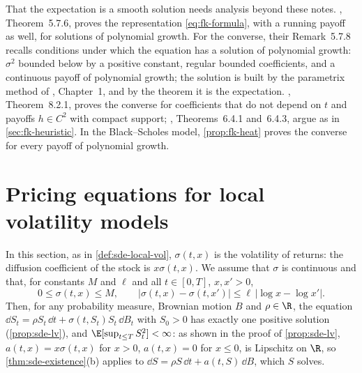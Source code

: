 \begin{remark}\label{rem:fk-converse}
That the expectation is a smooth solution needs analysis beyond these notes.
\textcite{karatzas-shreve}, Theorem~5.7.6, proves the representation \eqref{eq:fk-formula}, with a
running payoff as well, for solutions of polynomial growth. For the converse, their Remark~5.7.8
recalls conditions under which the equation has a solution of polynomial growth: $\sigma^2$
bounded below by a positive constant, regular bounded coefficients, and a continuous payoff
of polynomial growth; the solution is built by the parametrix method of \textcite{friedman-parabolic},
Chapter~1, and by the theorem it is the expectation. \textcite{oksendal}, Theorem~8.2.1, proves
the converse for coefficients that do not depend on $t$ and payoffs $h\in C^2$ with compact
support; \textcite{shreve2}, Theorems~6.4.1 and~6.4.3, argue as in \cref{sec:fk-heuristic}. In the
Black--Scholes model, \cref{prop:fk-heat} proves the converse for every payoff of polynomial growth.
\end{remark}

\section{Pricing equations for local volatility models}\label{sec:fk-local-vol}

In this section, as in \cref{def:sde-local-vol}, $\sigma(t,x)$ is the volatility of returns:
the diffusion coefficient of the stock is $x\sigma(t,x)$. We assume that $\sigma$ is continuous
and that, for constants $M$ and $\ell$ and all $t\in[0,T]$, $x,x'>0$,
\begin{equation}\label{eq:fk-lv}
  0\le\sigma(t,x)\le M,\qquad|\sigma(t,x)-\sigma(t,x')|\le\ell\,|\log x-\log x'| .
\end{equation}
Then, for any probability measure, Brownian motion $B$ and $\rho\in\R$, the equation
$\dd S_t=\rho S_t\,\dd t+\sigma(t,S_t)S_t\,\dd B_t$ with $S_0>0$ has exactly one positive
solution (\cref{prop:sde-lv}), and $\E[\sup_{t\le T}S_t^2]<\infty$: as shown in the proof of \cref{prop:sde-lv},
$a(t,x)=x\sigma(t,x)$ for $x>0$, $a(t,x)=0$ for $x\le0$, is Lipschitz on $\R$, so
\cref{thm:sde-existence}(b) applies to $\dd S=\rho S\,\dd t+a(t,S)\,\dd B$, which $S$ solves.

